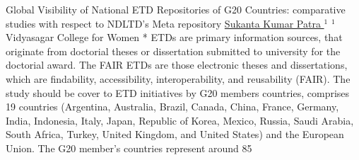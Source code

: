 
    \begin{abstract_online}{ Global Visibility of National ETD Repositories of G20 Countries: comparative studies with respect to NDLTD’s Meta repository}{%
        \underline{ Sukanta Kumar Patra }$^{1}$}{%
        }{%
        $^1$  Vidyasagar College for Women *\newline{}
            }
	ETDs are primary information sources, that originate from doctorial theses or dissertation submitted to university for the doctorial award. The FAIR ETDs are those electronic theses and dissertations, which are findability, accessibility, interoperability, and reusability (FAIR). The study should be cover to ETD initiatives by G20 members countries, comprises 19 countries (Argentina, Australia, Brazil, Canada, China, France, Germany, India, Indonesia, Italy, Japan, Republic of Korea, Mexico, Russia, Saudi Arabia, South Africa, Turkey, United Kingdom, and United States) and the European Union. The G20 member’s countries represent around 85%
    \end{abstract_online}
    
